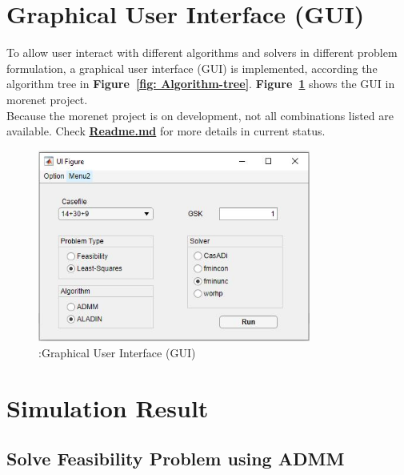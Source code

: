 \documentclass{article}
\begin{document}
\section{Graphical User Interface (GUI)}

To allow user interact with different algorithms and solvers in different problem formulation, a graphical user interface (GUI) is implemented, according the algorithm tree in \textbf{Figure~\ref{fig: Algorithm-tree}}. \textbf{Figure~\ref{fig:Graphical User Interface}} shows the GUI in morenet project.\\

Because the morenet project is on development, not all combinations listed are available. Check \textbf{\href{https://iai-vcs.iai.kit.edu/advancedcontrol/code/morenet/morenet/-/blob/Least_squares_problem/readme.md}{Readme.md}} for more details in current status.

\begin{figure}[hbt!]
 \begin{center}
    \includegraphics[width=0.8\textwidth]{visualization/GUI.JPG}
    \caption{:Graphical User Interface (GUI)}
    \label{fig:Graphical User Interface}
 \end{center}
\end{figure}
\clearpage
\newpage
\section{Simulation Result}

\subsection{Solve Feasibility Problem using ADMM}
\end{document}
